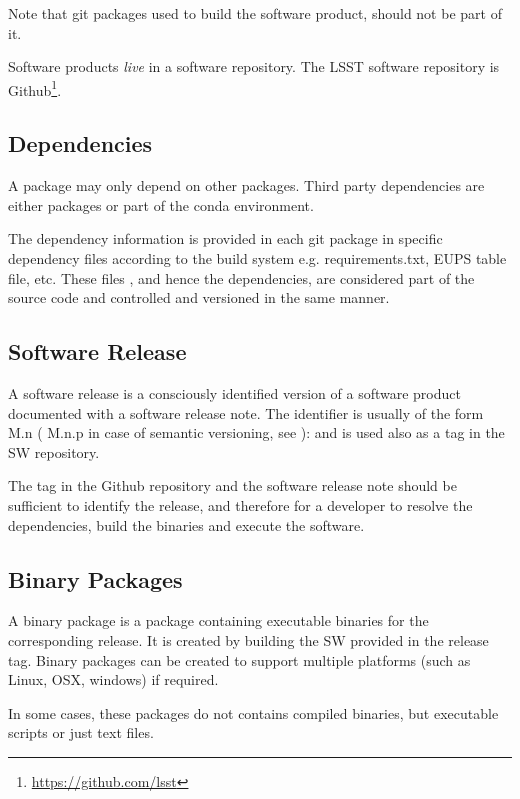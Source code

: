 Note that git packages used to build the software product, should not be part of it.

Software products \textit{live} in a software repository. The LSST software repository is Github\footnote{\url{https://github.com/lsst}}.


\subsection{Dependencies} \label{sec:dependencies}

A package may only depend on other packages. Third party dependencies are either packages or part of the conda environment.

The dependency information is provided in each git package in specific dependency files  according to the build system e.g.  requirements.txt, EUPS table file, etc.
These files , and hence the dependencies,  are considered part of the source code and controlled  and versioned in the same manner.


\subsection{Software Release} \label{sec:swrel}

A software release is  a consciously identified version of a  software product
documented with a software release note.
The identifier is usually of the form M.n ( M.n.p in case of semantic versioning, see ): and is used also as a tag in the SW repository.

The tag in the Github repository and the software release note should be sufficient to identify the release, and therefore for a developer
to resolve the dependencies, build the binaries and execute the software.


\subsection{Binary Packages} \label{sec:swbpkg}

A binary package is a package containing executable binaries for the corresponding release.
It is created by building the SW provided in the release tag.
Binary packages can be created to support multiple platforms (such as Linux, OSX, windows) if required.

In some cases, these packages do not contains compiled binaries, but executable scripts or just text files.

